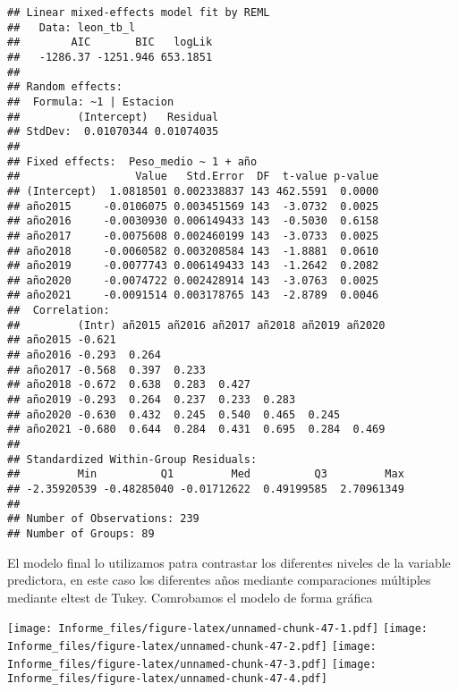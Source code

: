 \documentclass[
]{article}
\begin{document}
\begin{verbatim}
## Linear mixed-effects model fit by REML
##   Data: leon_tb_l 
##        AIC       BIC   logLik
##   -1286.37 -1251.946 653.1851
## 
## Random effects:
##  Formula: ~1 | Estacion
##         (Intercept)   Residual
## StdDev:  0.01070344 0.01074035
## 
## Fixed effects:  Peso_medio ~ 1 + año 
##                  Value   Std.Error  DF  t-value p-value
## (Intercept)  1.0818501 0.002338837 143 462.5591  0.0000
## año2015     -0.0106075 0.003451569 143  -3.0732  0.0025
## año2016     -0.0030930 0.006149433 143  -0.5030  0.6158
## año2017     -0.0075608 0.002460199 143  -3.0733  0.0025
## año2018     -0.0060582 0.003208584 143  -1.8881  0.0610
## año2019     -0.0077743 0.006149433 143  -1.2642  0.2082
## año2020     -0.0074722 0.002428914 143  -3.0763  0.0025
## año2021     -0.0091514 0.003178765 143  -2.8789  0.0046
##  Correlation: 
##         (Intr) añ2015 añ2016 añ2017 añ2018 añ2019 añ2020
## año2015 -0.621                                          
## año2016 -0.293  0.264                                   
## año2017 -0.568  0.397  0.233                            
## año2018 -0.672  0.638  0.283  0.427                     
## año2019 -0.293  0.264  0.237  0.233  0.283              
## año2020 -0.630  0.432  0.245  0.540  0.465  0.245       
## año2021 -0.680  0.644  0.284  0.431  0.695  0.284  0.469
## 
## Standardized Within-Group Residuals:
##         Min          Q1         Med          Q3         Max 
## -2.35920539 -0.48285040 -0.01712622  0.49199585  2.70961349 
## 
## Number of Observations: 239
## Number of Groups: 89
\end{verbatim}

El modelo final lo utilizamos patra contrastar los diferentes niveles de
la variable predictora, en este caso los diferentes años mediante
comparaciones múltiples mediante eltest de Tukey. Comrobamos el modelo
de forma gráfica

\texttt{[image: Informe\_files/figure-latex/unnamed-chunk-47-1.pdf]}
\texttt{[image: Informe\_files/figure-latex/unnamed-chunk-47-2.pdf]}
\texttt{[image: Informe\_files/figure-latex/unnamed-chunk-47-3.pdf]}
\texttt{[image: Informe\_files/figure-latex/unnamed-chunk-47-4.pdf]}
\end{document}

